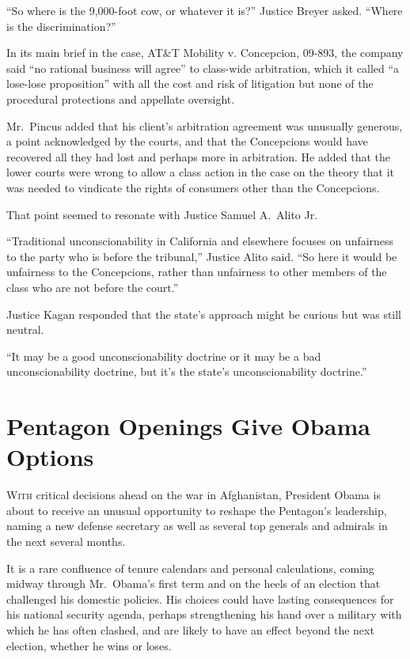 ﻿\documentclass[12pt]{article}
\begin{document}
``So where is the 9,000-foot cow, or whatever it is?'' Justice Breyer asked. ``Where is the
discrimination?''

In its main brief in the case, AT\&T Mobility v. Concepcion, 09-893, the company said ``no rational
business will agree'' to class-wide arbitration, which it called ``a lose-lose proposition'' with
all the cost and risk of litigation but none of the procedural protections and appellate oversight.

Mr.~Pincus added that his client's arbitration agreement was unusually generous, a point
acknowledged by the courts, and that the Concepcions would have recovered all they had lost and
perhaps more in arbitration. He added that the lower courts were wrong to allow a class action in
the case on the theory that it was needed to vindicate the rights of consumers other than the
Concepcions.

That point seemed to resonate with Justice Samuel A.~Alito Jr.

``Traditional unconscionability in California and elsewhere focuses on unfairness to the party who
is before the tribunal,'' Justice Alito said. ``So here it would be unfairness to the Concepcions,
rather than unfairness to other members of the class who are not before the court.''

Justice Kagan responded that the state's approach might be curious but was still neutral.

``It may be a good unconscionability doctrine or it may be a bad unconscionability doctrine, but
it's the state's unconscionability doctrine.''

\section{Pentagon Openings Give Obama Options}

\lettrine{W}{ith} critical decisions ahead on the war in Afghanistan,
President Obama is about to receive an unusual opportunity to reshape the Pentagon's leadership,
naming a new defense secretary as well as several top generals and admirals in the next several
months.

It is a rare confluence of tenure calendars and personal calculations, coming midway through
Mr.~Obama's first term and on the heels of an election that challenged his domestic policies. His
choices could have lasting consequences for his national security agenda, perhaps strengthening his
hand over a military with which he has often clashed, and are likely to have an effect beyond the
next election, whether he wins or loses.
\end{document}

